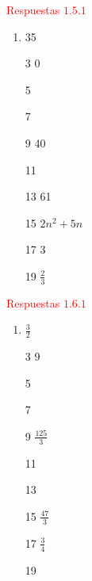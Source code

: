 \begin{multicols}{2}
 \textcolor{red}{Respuestas $1.5.1$} \\
 
\begin{enumerate}
\item  35 
\item[3] 0 
\item[5] 
\item[7]
\item[9]  40 
\item[11]
\item[13] 61 
\item[15] $2n^2+5n$ 
\item[17] 3
\item[19] $\frac{2}{3}$ 
\end{enumerate}


 \textcolor{red}{Respuestas $1.6.1$} \\

\begin{enumerate}
\item $\frac{3}{2}$
\item[3]  9
\item[5] 
\item[7]
\item[9] $\frac{125}{3}$
\item[11]
\item[13]  
\item[15] $\frac{47}{3} $
\item[17] $\frac{3}{4}$
\item[19] 
\end{enumerate}
\end{multicols}
 
